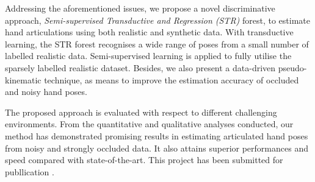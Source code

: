 \documentclass[10pt, a4paper]{article}
\begin{document}
Addressing the aforementioned issues, we propose a novel discriminative approach, \emph{Semi-supervised Transductive and Regression (STR)} forest, to estimate hand articulations using both realistic and synthetic data. With transductive learning, the STR forest recognises a wide range of poses from a small number of labelled realistic data. Semi-supervised learning is applied to fully utilise the sparsely labelled realistic dataset. Besides, we also present a data-driven pseudo-kinematic technique, as means to improve the estimation accuracy of occluded and noisy hand poses. 

The proposed approach is evaluated with respect to different challenging environments.    
From the quantitative and qualitative analyses conducted, our method has demonstrated promising results in estimating articulated hand poses from noisy and strongly occluded data.  
It also attains superior performances and speed compared with state-of-the-art. This project has been submitted for publlication \cite{Tang2013}.  


 
\end{document}
